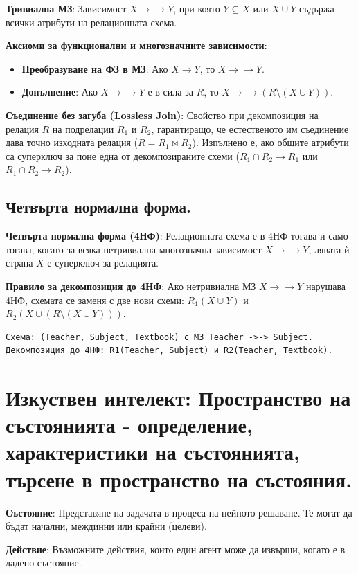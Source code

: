 \documentclass{article}
\renewcommand{\\}{\newline}
\begin{document}
\textbf{Тривиална МЗ}: Зависимост $X \rightarrow\rightarrow Y$, при която $Y \subseteq X$ или $X \cup Y$ съдържа всички атрибути на релационната схема.

\textbf{Аксиоми за функционални и многозначните зависимости}:
\begin{itemize}
\item \textbf{Преобразуване на ФЗ в МЗ}: Ако $X \rightarrow Y$, то $X \rightarrow\rightarrow Y$.
\item \textbf{Допълнение}: Ако $X \rightarrow\rightarrow Y$ е в сила за $R$, то $X \rightarrow\rightarrow (R \setminus (X \cup Y))$.
\end{itemize}

\textbf{Съединение без загуба (Lossless Join)}: Свойство при декомпозиция на релация $R$ на подрелации $R_1$ и $R_2$, гарантиращо, че естественото им съединение дава точно изходната релация ($R = R_1 \bowtie R_2$). Изпълнено е, ако общите атрибути са суперключ за поне една от декомпозираните схеми ($R_1 \cap R_2 \rightarrow R_1$ или $R_1 \cap R_2 \rightarrow R_2$).

\subsection{Четвърта нормална форма.}

\textbf{Четвърта нормална форма (4НФ)}: Релационната схема е в 4НФ тогава и само тогава, когато за всяка нетривиална многозначна зависимост $X \rightarrow\rightarrow Y$, лявата ѝ страна $X$ е суперключ за релацията.

\textbf{Правило за декомпозиция до 4НФ}: Ако нетривиална МЗ $X \rightarrow\rightarrow Y$ нарушава 4НФ, схемата се заменя с две нови схеми: $R_1(X \cup Y)$ и $R_2(X \cup (R \setminus (X \cup Y)))$.
\begin{verbatim}
Схема: (Teacher, Subject, Textbook) с МЗ Teacher ->-> Subject.
Декомпозиция до 4НФ: R1(Teacher, Subject) и R2(Teacher, Textbook).
\end{verbatim}
\newpage
\section{Изкуствен интелект: Пространство на състоянията - определение, характеристики на състоянията, търсене в пространство на състояния.}

\textbf{Състояние}: Представяне на задачата в процеса на нейното решаване. Те могат да бъдат начални, междинни или крайни (целеви).

\textbf{Действие}: Възможните действия, които един агент може да извърши, когато е в дадено състояние.
\end{document}
